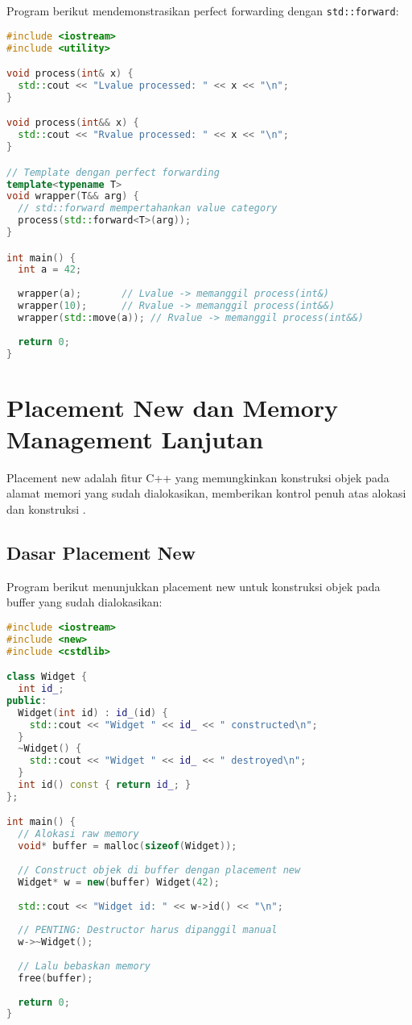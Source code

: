 \documentclass[../main.tex]{subfiles}
\begin{document}
Program berikut mendemonstrasikan perfect forwarding dengan \texttt{std::forward}:

\begin{lstlisting}[language=C++, caption={Perfect forwarding dengan std::forward}]
#include <iostream>
#include <utility>

void process(int& x) {
  std::cout << "Lvalue processed: " << x << "\n";
}

void process(int&& x) {
  std::cout << "Rvalue processed: " << x << "\n";
}

// Template dengan perfect forwarding
template<typename T>
void wrapper(T&& arg) {
  // std::forward mempertahankan value category
  process(std::forward<T>(arg));
}

int main() {
  int a = 42;
  
  wrapper(a);       // Lvalue -> memanggil process(int&)
  wrapper(10);      // Rvalue -> memanggil process(int&&)
  wrapper(std::move(a)); // Rvalue -> memanggil process(int&&)
  
  return 0;
}
\end{lstlisting}

\section{Placement New dan Memory Management Lanjutan}
Placement new adalah fitur C++ yang memungkinkan konstruksi objek pada alamat memori yang sudah dialokasikan, memberikan kontrol penuh atas alokasi dan konstruksi \parencite{cpp-reference}.

\subsection{Dasar Placement New}

Program berikut menunjukkan placement new untuk konstruksi objek pada buffer yang sudah dialokasikan:

\begin{lstlisting}[language=C++, caption={Penggunaan placement new}]
#include <iostream>
#include <new>
#include <cstdlib>

class Widget {
  int id_;
public:
  Widget(int id) : id_(id) {
    std::cout << "Widget " << id_ << " constructed\n";
  }
  ~Widget() {
    std::cout << "Widget " << id_ << " destroyed\n";
  }
  int id() const { return id_; }
};

int main() {
  // Alokasi raw memory
  void* buffer = malloc(sizeof(Widget));
  
  // Construct objek di buffer dengan placement new
  Widget* w = new(buffer) Widget(42);
  
  std::cout << "Widget id: " << w->id() << "\n";
  
  // PENTING: Destructor harus dipanggil manual
  w->~Widget();
  
  // Lalu bebaskan memory
  free(buffer);
  
  return 0;
}
\end{lstlisting}
\end{document}
